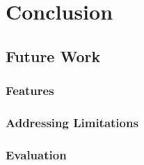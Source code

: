 
\chapter{Conclusion}\label{chapter:conclusion}

\section*{Future Work}

\subsection*{Features}

\subsection*{Addressing Limitations}

\subsection*{Evaluation}